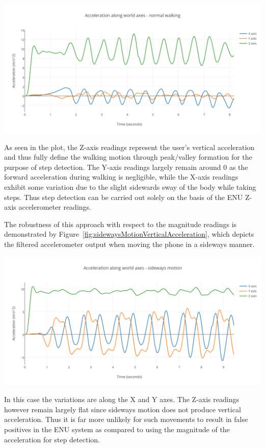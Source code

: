 \documentclass[12pt,a4paper]{report}
\begin{document}
\begin{center}
\includegraphics[scale=0.9]{images/straightWalkVerticalAcceleration.png}
\label{fig:straightWalkVerticalAcceleration}
\end{center}
As seen in the plot, the Z-axis readings represent the user's vertical acceleration and thus fully define the walking motion through peak/valley formation for the purpose of step detection. The Y-axis readings largely remain around 0 as the forward acceleration during walking is negligible, while the X-axis readings exhibit some variation due to the slight sidewards sway of the body while taking steps. Thus step detection can be carried out solely on the basis of the ENU Z-axis accelerometer readings.  

The robustness of this approach with respect to the magnitude readings is demonstrated by Figure~\ref{fig:sidewaysMotionVerticalAcceleration}, which depicts the filtered accelerometer output when moving the phone in a sideways manner.  

\begin{center}
\includegraphics[scale=0.9]{images/sidewaysMotionVerticalAcceleration.png}
\label{fig:sidewaysMotionVerticalAcceleration}
\end{center}
In this case the variations are along the X and Y axes. The Z-axis readings however remain largely flat since sideways motion does not produce vertical acceleration. Thus it is far more unlikely for such movements to result in false positives in the ENU system as compared to using the magnitude of the acceleration for step detection. 
\end{document}

